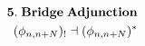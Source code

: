 \documentclass[preview]{standalone}
\begin{document}
\begin{align*}
\special{dvisvgm:raw <g id='unique000'>}\mathbf{5.\;Bridge\;Adjunction}\\(\phi_{n,n+N})_!\dashv(\phi_{n,n+N})^*\special{dvisvgm:raw </g>}
\end{align*}
\end{document}

